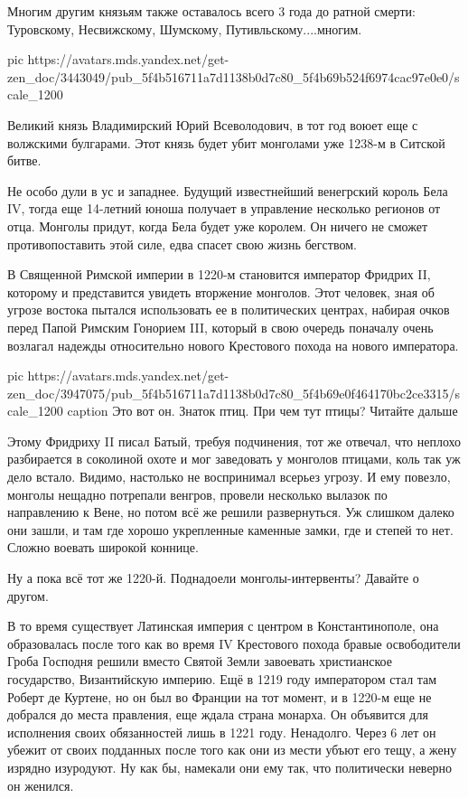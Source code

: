 Многим другим князьям также оставалось всего 3 года до ратной смерти:
Туровскому, Несвижскому, Шумскому, Путивльскому....многим.

\ifcmt
pic https://avatars.mds.yandex.net/get-zen_doc/3443049/pub_5f4b516711a7d1138b0d7c80_5f4b69b524f6974cac97e0e0/scale_1200
\fi

Великий князь Владимирский Юрий Всеволодович, в тот год воюет еще с волжскими
булгарами. Этот князь будет убит монголами уже 1238-м в Ситской битве.

Не особо дули в ус и западнее. Будущий известнейший венегрский король Бела IV,
тогда еще 14-летний юноша получает в управление несколько регионов от отца.
Монголы придут, когда Бела будет уже королем. Он ничего не сможет
противопоставить этой силе, едва спасет свою жизнь бегством.

В Священной Римской империи в 1220-м становится император Фридрих II, которому
и представится увидеть вторжение монголов. Этот человек, зная об угрозе востока
пытался использовать ее в политических центрах, набирая очков перед Папой
Римским Гонорием III, который в свою очередь поначалу очень возлагал надежды
относительно нового Крестового похода на нового императора.

\ifcmt
pic https://avatars.mds.yandex.net/get-zen_doc/3947075/pub_5f4b516711a7d1138b0d7c80_5f4b69e0f464170bc2ce3315/scale_1200
caption Это вот он. Знаток птиц. При чем тут птицы? Читайте дальше
\fi

Этому Фридриху II писал Батый, требуя подчинения, тот же отвечал, что неплохо
разбирается в соколиной охоте и мог заведовать у монголов птицами, коль так уж
дело встало. Видимо, настолько не воспринимал всерьез угрозу. И ему повезло,
монголы нещадно потрепали венгров, провели несколько вылазок по направлению к
Вене, но потом всё же решили развернуться. Уж слишком далеко они зашли, и там
где хорошо укрепленные каменные замки, где и степей то нет. Сложно воевать
широкой коннице.

Ну а пока всё тот же 1220-й. Поднадоели монголы-интервенты? Давайте о другом.

В то время существует Латинская империя с центром в Константинополе, она
образовалась после того как во время IV Крестового похода бравые освободители
Гроба Господня решили вместо Святой Земли завоевать христианское государство,
Византийскую империю. Ещё в 1219 году императором стал там Роберт де Куртене,
но он был во Франции на тот момент, и в 1220-м еще не добрался до места
правления, еще ждала страна монарха. Он объявится для исполнения своих
обязанностей лишь в 1221 году. Ненадолго. Через 6 лет он убежит от своих
подданных после того как они из мести убъют его тещу, а жену изрядно изуродуют.
Ну как бы, намекали они ему так, что политически неверно он женился.

